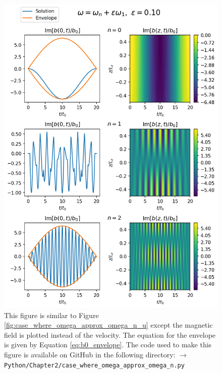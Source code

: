 \begin{figure}
    \centering
    \vspace{-20pt}
    \includegraphics[width=\textwidth,height=0.9\textheight,keepaspectratio]{figures/chapter02/case_where_omega_approx_omega_n_b.png}
    \vspace{-10pt}
    \caption{This figure is similar to Figure \ref{fig:case_where_omega_approx_omega_n_u} except the magnetic field is plotted instead of the velocity. The equation for the envelope is given by Equation \eqref{eq:b0_envelope}. The code used to make this figure is available on GitHub in the following directory:\newline
    \texttt{$\rightarrow$ Python/Chapter2/case\_where\_omega\_approx\_omega\_n.py}}
    \vspace{-30pt}
    \label{fig:case_where_omega_approx_omega_n_b}
\end{figure}


